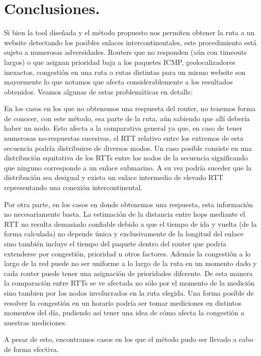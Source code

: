 \section{Conclusiones.}

Si bien la tool diseñada y el método propuesto nos permiten obtener la ruta a un website detectando los posibles enlaces intercontinentales, este procedimiento está sujeto a numerosas adversidades. Routers que no responden (aún con timeouts largos) o que asignan prioridad baja a los paquetes ICMP,  geolocalizadores inexactos, congestión en una ruta o rutas distintas para un mismo website son mayormente lo que notamos que afecta considerablemente a los resultados obtenidos.  Veamos algunas de estas problemáticas en detalle:

En los casos en los que no obtenemos una respuesta del router, no tenemos forma de conocer, con este método, esa parte de la ruta, aún sabiendo que allí debería haber un nodo. Esto afecta a la comparativa general ya que, en caso de tener numerosas no-respuestas sucesivas, el RTT relativo entre los extremos de esta secuencia podría distribuirse de diversos modos. Un caso posible consiste en una distribución equitativa de los RTTs entre los nodos de la secuencia significando que ninguno corresponde a un enlace submarino. A su vez podría suceder que la distribución sea desigual y exista un enlace intermedio de elevado RTT representando una conexión intercontinental.

Por otra parte, en los casos en donde obtenemos una respuesta, esta información no necesariamente basta. La estimación de la distancia entre hops mediante el RTT no resulta demasiado confiable debido a que el tiempo de ida y vuelta (de la forma calculada) no depende única y exclusivamente de la longitud del enlace sino también incluye el tiempo del paquete dentro del router que podría extenderse por congestión, prioridad u otros factores. Además la congestión a lo largo de la red puede no ser uniforme a lo largo de la ruta en un momento dado y cada router puede tener una asignación de prioridades diferente. De esta manera la comparación entre RTTs se ve afectada no sólo por el momento de la medición sino tambien por los nodos involucrados en la ruta elegida. Una forma posible de resolver la congestión en un horario podría ser tomar mediciones en distintos momentos del día, pudiendo así tener una idea de cómo afecta la congestión a nuestras mediciones.

A pesar de esto, encontramos casos en los que el método pudo ser llevado a cabo de forma efectiva.
